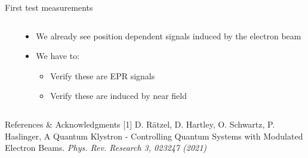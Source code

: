 \documentclass[final]{beamer}
\begin{document}
\begin{frame}[fragile]{}
\begin{columns}[T]
\begin{column}{.49\linewidth}
\begin{block}{\Large First test measurements}
\begin{columns}
\begin{column}{0.35\columnwidth}
			\end{column}
			\begin{column}{0.55\columnwidth}
				\begin{itemize}
					\item We already see position dependent signals induced by the electron beam
					\item We have to:
					\begin{itemize}
						\item Verify these are EPR signals
						\item Verify these are induced by near field
					\end{itemize}
				\end{itemize}
			\end{column}
		\end{columns}
	\end{block}

      \begin{block}{\Large References \& Acknowledgments}
        [1] D. Rätzel, D. Hartley, O. Schwartz, P. Haslinger, A Quantum
        Klystron - Controlling Quantum Systems with Modulated Electron Beams.
        \textit{Phys. Rev. Research 3, 023247 (2021)}
      \end{block}


\end{column}
\end{columns}
\end{frame}
\end{document}
